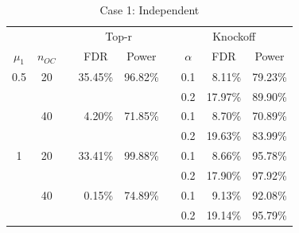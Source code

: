 \documentclass[a4paper,12pt]{article}
\begin{document}
\begin{table}[htbp]
  \centering
  \caption{Case 1: Independent}
    \begin{tabular}{ccrrrrrrr}
    \midrule
      &   &   & \multicolumn{2}{c}{Top-r} &   & \multicolumn{3}{c}{Knockoff} \\
\cmidrule{4-5}\cmidrule{7-9}    \multicolumn{1}{c}{$\mu_1$} & \multicolumn{1}{c}{$n_{OC}$} &   & \multicolumn{1}{c}{FDR} & \multicolumn{1}{c}{Power} &   & \multicolumn{1}{c}{$\alpha$} & \multicolumn{1}{c}{FDR} & \multicolumn{1}{c}{Power} \\
    \midrule
    0.5 & 20 &   & 35.45\% & 96.82\% &   & 0.1 & 8.11\% & 79.23\% \\
      &   &   &   &   &   & 0.2 & 17.97\% & 89.90\% \\
      & 40 &   & 4.20\% & 71.85\% &   & 0.1 & 8.70\% & 70.89\% \\
      &   &   &   &   &   & 0.2 & 19.63\% & 83.99\% \\
    1 & 20 &   & 33.41\% & 99.88\% &   & 0.1 & 8.66\% & 95.78\% \\
      &   &   &   &   &   & 0.2 & 17.90\% & 97.92\% \\
      & 40 &   & 0.15\% & 74.89\% &   & 0.1 & 9.13\% & 92.08\% \\
      &   &   &   &   &   & 0.2 & 19.14\% & 95.79\% \\
      \midrule
    \end{tabular}%
  \label{tab:addlabel}%
\end{table}%
\end{document}
